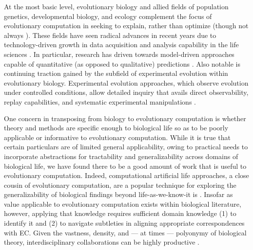 At the most basic level, evolutionary biology and allied fields of population genetics, developmental biology, and ecology complement the focus of evolutionary computation in seeking to explain, rather than optimize (though not always \citep{cobb2013directed,carroll2014applying}).
These fields have seen radical advances in recent years due to technology-driven growth in data acquisition and analysis capability in the life sciences \citep{TODO}.
In particular, research has driven towards model-driven approaches capable of quantitative (as opposed to qualitative) predictions \citep{TODO}.
Also notable is continuing traction gained by the subfield of experimental evolution within evolutionary biology.
Experimental evolution approaches, which observe evolution under controlled conditions, allow detailed inquiry that avails direct observability, replay capabilities, and systematic experimental manipulations \citep{kawecki2012experimental}.

One concern in transposing from biology to evolutionary computation is whether theory and methods are specific enough to biological life so as to be poorly applicable or informative to evolutionary computation.
While it is true that certain particulars are of limited general applicability, owing to practical needs to incorporate abstractions for tractability and generalizability across domains of biological life, we have found there to be a good amount of work that is useful to evolutionary computation.
Indeed, computational artificial life approaches, a close cousin of evolutionary computation, are a popular technique for exploring the generalizability of biological findings beyond life-as-we-know-it is \citep{cleland2013general}. %
Insofar as value applicable to evolutionary computation exists within biological literature, however, applying that knowledge requires sufficient domain knowledge (1) to identify it and (2) to navigate subtleties in aligning appropriate correspondences with EC.
Given the vastness, density, and --- at times --- polyonymy of biological theory, interdisciplinary collaborations can be highly productive \citep{goodman2020evolution}.

